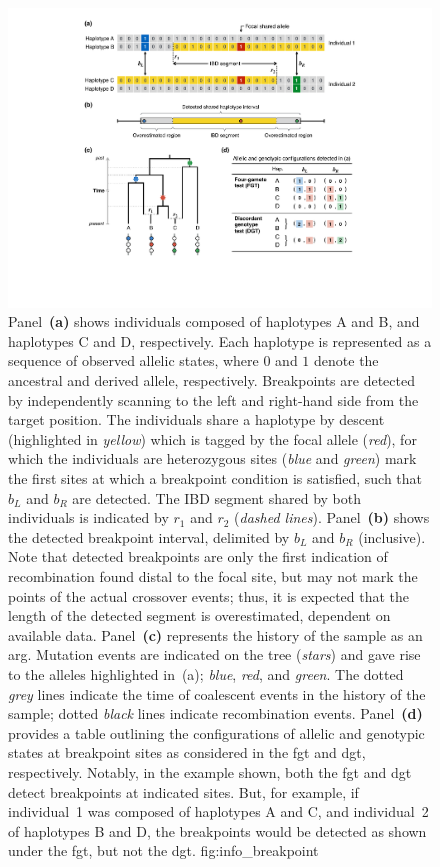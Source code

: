 

\begin{figure}[!tbp]
\centering
\includegraphics[width=\textwidth]{./img/ch3/info_breakpoint}
{Panel~\textbf{(a)} shows  individuals composed of haplotypes A and B, and haplotypes C and D, respectively.
Each haplotype is represented as a sequence of observed allelic states, where $0$ and $1$ denote the ancestral and derived allele, respectively.
Breakpoints are detected by independently scanning to the left and right-hand side from the target position.
The  individuals share a haplotype by descent (highlighted in \emph{yellow}) which is tagged by the focal allele (\emph{red}), for which the  individuals are heterozygous
 sites (\emph{blue} and \emph{green}) mark the first sites at which a breakpoint condition is satisfied, such that $b_{L}$ and $b_{R}$ are detected.
The IBD segment shared by both individuals is indicated by $r_{1}$ and $r_{2}$ (\emph{dashed lines}).
Panel~\textbf{(b)} shows the detected breakpoint interval, delimited by $b_{L}$ and $b_{R}$ (inclusive).
Note that detected breakpoints are only the first indication of recombination found distal to the focal site, but may not mark the points of the actual crossover events; thus, it is expected that the length of the detected segment is overestimated, dependent on available data.
Panel~\textbf{(c)} represents the history of the sample as an \gls{arg}.
Mutation events are indicated on the tree (\emph{stars}) and gave rise to the alleles highlighted in~(a); \emph{blue}, \emph{red}, and \emph{green}.
The dotted \emph{grey} lines indicate the time of coalescent events in the history of the sample; dotted \emph{black} lines indicate recombination events.
Panel~\textbf{(d)} provides a table outlining the configurations of allelic and genotypic states at breakpoint sites as considered in the \gls{fgt} and \gls{dgt}, respectively.
Notably, in the example shown, both the \gls{fgt} and \gls{dgt} detect breakpoints at indicated sites.
But, for example, if individual~1 was composed of haplotypes A and C, and individual~2 of haplotypes B and D, the breakpoints would be detected as shown under the \gls{fgt}, but not the \gls{dgt}.}
{fig:info_breakpoint}
\end{figure}
